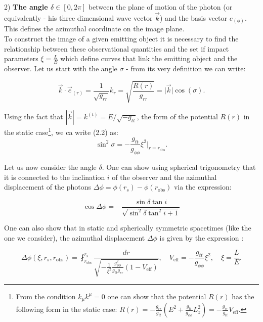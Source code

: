 \documentclass[12pt]{article}
\numberwithin{equation}{section}
\numberwithin{figure}{section}
\begin{document}
	2) \textbf{The angle $\delta\in[0,2\pi]$} between the plane of motion of the photon (or equivalently - his three dimensional wave vector $\vec{k}$) and the basis vector $e_{(\phi)}$. This defines the azimuthal coordinate on the image plane.\\
	
	To construct the image of a given emitting object it is necessary to find the relationship between these observational quantities and the set if impact parameters $\xi = \frac{L}{E}$ which define curves that link the emitting object and the observer. Let us start with the angle $\sigma$ - from its very definition we can write:
	
	\begin{equation}
		\vec{k} \cdot \vec{e}_{(r)} = \frac{1}{\sqrt{g_{rr}}}k_{r} = \sqrt{\frac{R(r)}{g_{rr}}} =  \big\vert \vec{k}\big\vert \cos(\sigma).
	\end{equation}
	\newpage
	
	Using the fact that $|\vec{k}| = k^{(t)} = E/\sqrt{-g_{tt}}$,  the form of the potential $R(r)$ in the static case\footnote{From the condition $k_\mu k^\mu = 0$ one can show that the potential $R(r)$ has the following form in the static case: $R(r) = -\frac{g_{rr}}{g_{tt}}\left(E^2 + \frac{g_{tt}}{g_{\phi\phi}}L_z^2\right) = -\frac{g_{rr}}{g_{tt}} V_\text{eff}$.}, we ca write (2.2) as:
	\begin{equation}
		\sin^2\sigma = -\frac{g_{tt}}{g_{\phi\phi}}\xi^2\bigg\vert_{r = r_\text{obs}}.
	\end{equation}
	
	Let us now consider the angle $\delta$. One can show using spherical trigonometry \cite{Muller2009} that it is connected to the inclination $i$ of the observer and the azimuthal displacement of the photons $\Delta\phi = \phi(r_s) - \phi(r_\text{obs})$ via the expression:

	\begin{equation}
		\cos\Delta\phi = - \frac{\sin\delta\tan i}{\sqrt{\sin^2\delta\tan^2 i + 1}}
	\end{equation}
	
	One can also show that in static and spherically symmetric spacetimes (like the one we consider), the azimuthal displacement $\Delta\phi$ is given by the expression \cite{Muller2009}:

	\begin{equation}
		\Delta\phi(\xi,r_s,r_\text{obs}) = \fint_{r_\text{obs}}^{r_\text{s}}\frac{dr}{\sqrt{-\frac{1}{\xi^2}\frac{g^2_{\phi\phi}}{g_{tt}g_{rr}}(1 - V_\text{eff})}},\quad V_\text{eff} = -\frac{g_{tt}}{g_{\phi\phi}}\xi^2,\quad \xi = \frac{L}{E}.
	\end{equation}
	
\end{document}
